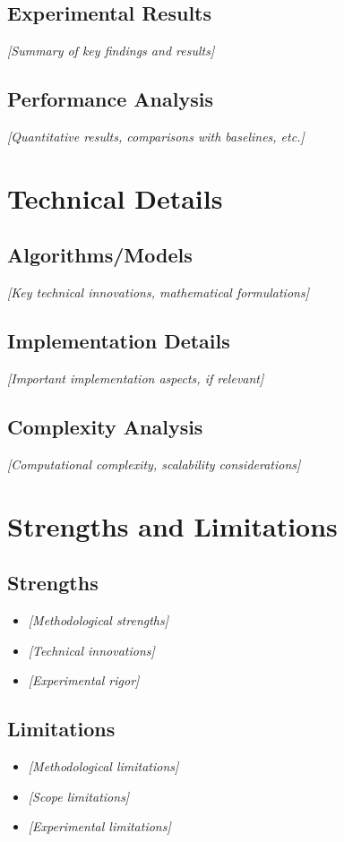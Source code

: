 \documentclass[11pt]{article}
\begin{document}
	\subsection{Experimental Results}
	\textit{[Summary of key findings and results]}
	
	\subsection{Performance Analysis}
	\textit{[Quantitative results, comparisons with baselines, etc.]}
	
	\section{Technical Details}
	\subsection{Algorithms/Models}
	\textit{[Key technical innovations, mathematical formulations]}
	
	\subsection{Implementation Details}
	\textit{[Important implementation aspects, if relevant]}
	
	\subsection{Complexity Analysis}
	\textit{[Computational complexity, scalability considerations]}
	
	\section{Strengths and Limitations}
	\subsection{Strengths}
	\begin{itemize}
		\item \textit{[Methodological strengths]}
		\item \textit{[Technical innovations]}
		\item \textit{[Experimental rigor]}
	\end{itemize}
	
	\subsection{Limitations}
	\begin{itemize}
		\item \textit{[Methodological limitations]}
		\item \textit{[Scope limitations]}
		\item \textit{[Experimental limitations]}
	\end{itemize}
	
\end{document}
